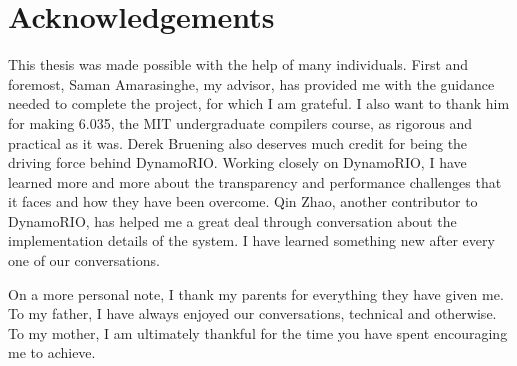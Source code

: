 \chapter*{Acknowledgements}

This thesis was made possible with the help of many individuals.  First and
foremost, Saman Amarasinghe, my advisor, has provided me with the guidance
needed to complete the project, for which I am grateful.  I also want to thank
him for making 6.035, the MIT undergraduate compilers course, as rigorous and
practical as it was.  Derek Bruening also deserves much credit for being the
driving force behind DynamoRIO.  Working closely on DynamoRIO, I have learned
more and more about the transparency and performance challenges that it faces
and how they have been overcome.  Qin Zhao, another contributor to DynamoRIO,
has helped me a great deal through conversation about the implementation details
of the system.  I have learned something new after every one of our
conversations.

On a more personal note, I thank my parents for everything they have given me.
To my father, I have always enjoyed our conversations, technical and otherwise.
To my mother, I am ultimately thankful for the time you have spent encouraging
me to achieve.







